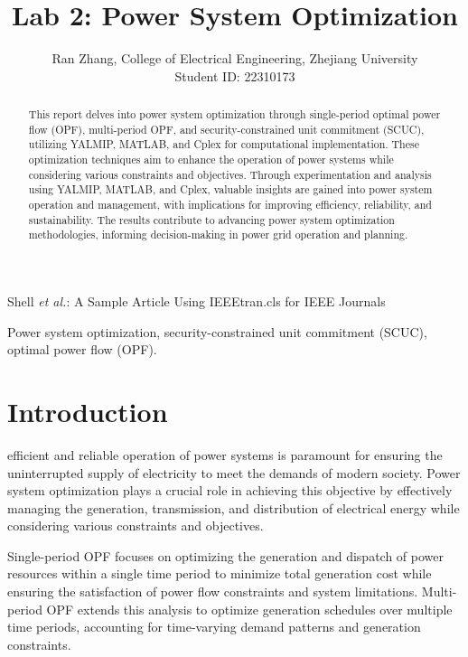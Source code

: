 \documentclass[lettersize,journal]{IEEEtran}
\begin{document}
\title{Lab 2: Power System Optimization}

\author{Ran Zhang, College of Electrical Engineering, Zhejiang University \\Student ID: 22310173
}


%
{Shell \MakeLowercase{\textit{et al.}}: A Sample Article Using IEEEtran.cls for IEEE Journals}

\maketitle

\begin{abstract}
This report delves into power system optimization through single-period optimal power flow (OPF), multi-period OPF, and security-constrained unit commitment (SCUC), utilizing YALMIP, MATLAB, and Cplex for computational implementation. These optimization techniques aim to enhance the operation of power systems while considering various constraints and objectives. Through experimentation and analysis using YALMIP, MATLAB, and Cplex, valuable insights are gained into power system operation and management, with implications for improving efficiency, reliability, and sustainability. The results contribute to advancing power system optimization methodologies, informing decision-making in power grid operation and planning.
\end{abstract}

\begin{IEEEkeywords}
Power system optimization, security-constrained unit commitment (SCUC), optimal power flow (OPF).
\end{IEEEkeywords}

\section{Introduction}
 efficient and reliable operation of power systems is paramount for ensuring the uninterrupted supply of electricity to meet the demands of modern society. Power system optimization plays a crucial role in achieving this objective by effectively managing the generation, transmission, and distribution of electrical energy while considering various constraints and objectives.

Single-period OPF focuses on optimizing the generation and dispatch of power resources within a single time period to minimize total generation cost while ensuring the satisfaction of power flow constraints and system limitations. Multi-period OPF extends this analysis to optimize generation schedules over multiple time periods, accounting for time-varying demand patterns and generation constraints.
\end{document}
